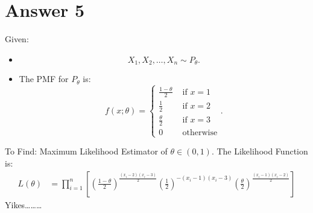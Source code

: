 \documentclass[a4paper]{article}
\begin{document}
 \section{Answer 5}
 Given:
 \begin{itemize}
	 \item {\[
				 X_1,X_2,\dots, X_{n} \sim P_{\theta}
	 .\] }
 \item{The PMF for $P_{\theta}$ is:
	 \[
	 f\left( x;\theta \right)  = \begin{cases}
	 	\frac{1-\theta}{2} &\text{ if } x=1\\
		\frac{1}{2}&\text{ if }x = 2\\
		\frac{\theta}{2} &\text{ if }x = 3\\
		0 &\text{ otherwise}
	\end{cases}	 .\] 
	 }
 \end{itemize}
 To Find: Maximum Likelihood Estimator of $\theta \in  \left( 0,1 \right) $.
\newline\newline
The Likelihood Function is:
\begin{equation*}
	\begin{split}
		L\left( \theta \right) &= \prod_{i=1}^{n}  \left[    \left( \frac{1-\theta}{2} \right) ^{\frac{\left( x_{i}-2 \right) \left( x_{i}-3 \right) }{2}}\left( \frac{1}{2} \right) ^{-\left( x_{i}-1 \right) \left( x_{i}-3 \right)}\left( \frac{\theta}{2} \right) ^{\frac{\left( x_{i}-1 \right) \left( x_{i}-2 \right) }{2} }\right]	
	\end{split}
\end{equation*}
Yikes\dots\dots\dots
\end{document}
